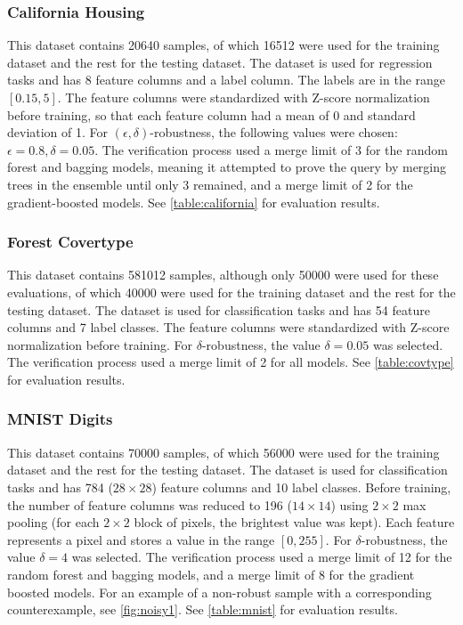 \documentclass[pageno]{jpaper}
\begin{document}
\begin{doublespacing}
\subsubsection{California Housing}
\label{sec:california}
This dataset contains 20640 samples, of which 16512 were used for the training dataset and the rest for the testing dataset. The dataset is used for regression tasks and has 8 feature columns and a label column. The labels are in the range $[0.15, 5]$. The feature columns were standardized with Z-score normalization before training, so that each feature column had a mean of 0 and standard deviation of 1. For $(\epsilon, \delta)$-robustness, the following values were chosen: $\epsilon = 0.8, \delta = 0.05$. The verification process used a merge limit of 3 for the random forest and bagging models, meaning it attempted to prove the query by merging trees in the ensemble until only 3 remained, and a merge limit of 2 for the gradient-boosted models. See \autoref{table:california} for evaluation results.

\subsubsection{Forest Covertype}
This dataset contains 581012 samples, although only 50000 were used for these evaluations, of which 40000 were used for the training dataset and the rest for the testing dataset. The dataset is used for classification tasks and has 54 feature columns and 7 label classes. The feature columns were standardized with Z-score normalization before training. For $\delta$-robustness, the value $\delta=0.05$ was selected. The verification process used a merge limit of 2 for all models. See \autoref{table:covtype} for evaluation results.

\subsubsection{MNIST Digits}
This dataset contains 70000 samples, of which 56000 were used for the training dataset and the rest for the testing dataset. The dataset is used for classification tasks and has 784 ($28 \times 28$) feature columns and 10 label classes. Before training, the number of feature columns was reduced to 196 ($14 \times 14$) using $2 \times 2$ max pooling (for each $2 \times 2$ block of pixels, the brightest value was kept). Each feature represents a pixel and stores a value in the range $[0, 255]$. For $\delta$-robustness, the value $\delta=4$ was selected. The verification process used a merge limit of 12 for the random forest and bagging models, and a merge limit of 8 for the gradient boosted models. For an example of a non-robust sample with a corresponding counterexample, see \autoref{fig:noisy1}. See \autoref{table:mnist} for evaluation results.


\end{doublespacing}
\end{document}

